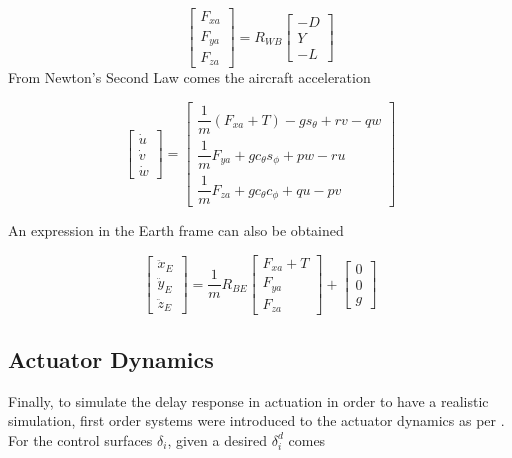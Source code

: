 \begin{equation}
\begin{bmatrix}
F_{xa}\\
F_{ya}\\
F_{za}
\end{bmatrix}
= R_{WB}
\begin{bmatrix}
-D\\
Y\\
-L
\end{bmatrix}
\label{eq:body_forces}
\end{equation}
From Newton's Second Law comes the aircraft acceleration

\begin{equation}
\begin{bmatrix}
\dot{u}\\
\dot{v}\\
\dot{w}
\end{bmatrix}
=
\begin{bmatrix}
\dfrac{1}{m}(F_{xa} + T) - gs_\theta +rv-qw\\
\dfrac{1}{m}F_{ya} + gc_\theta s_\phi + pw - ru\\
\dfrac{1}{m}F_{za} + gc_\theta c_\phi + qu - pv
\end{bmatrix}
\label{eq:boddy_acc}
\end{equation}

An expression in the Earth frame can also be obtained

\begin{equation}
\begin{bmatrix}
\ddot{x}_E\\
\ddot{y}_E\\
\ddot{z}_E
\end{bmatrix}
= \dfrac{1}{m} R_{BE}
\begin{bmatrix}
F_{xa}+T\\
F_{ya}\\
F_{za}
\end{bmatrix}
+
\begin{bmatrix}
0\\
0\\
g
\end{bmatrix}
\end{equation}

\subsection{Actuator Dynamics}

Finally, to simulate the delay response in actuation in order to have a realistic simulation, first order systems were introduced to the actuator dynamics as per \cite{hector}. For the control surfaces $\delta_i$, given a desired $\delta_i^d$ comes

